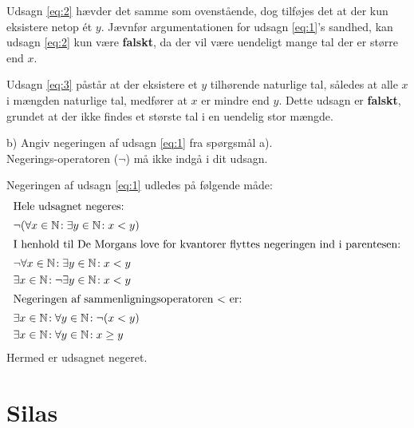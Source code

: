 \documentclass[12pt, a4paper]{article}
\begin{document}
Udsagn \eqref{eq:2} hævder det samme som ovenstående, dog tilføjes det at der kun eksistere netop ét \(y\). Jævnfør argumentationen for udsagn \eqref{eq:1}'s sandhed, kan udsagn \eqref{eq:2} kun være \textbf{falskt}, da der vil være uendeligt mange tal der er større end \(x\).

Udsagn \eqref{eq:3} påstår at der eksistere et \(y\) tilhørende naturlige tal, således at alle \(x\) i mængden naturlige tal, medfører at \(x\) er mindre end \(y\). Dette udsagn er \textbf{falskt}, grundet at der ikke findes et største tal i en uendelig stor mængde.
\begin{tcolorbox}
b) Angiv negeringen af udsagn \eqref{eq:1} fra spørgsmål a).\\ Negerings-operatoren (\(\neg\)) må ikke indgå i dit udsagn.
\end{tcolorbox}\vspace{-5pt}
Negeringen af udsagn \eqref{eq:1} udledes på følgende måde:\vspace{-5pt}
\begin{align}
\intertext{Hele udsagnet negeres:}
	&\neg(\forall x \in \mathbb{N}\! : \exists y \in \mathbb{N}\! : x < y)\\
\intertext{I henhold til De Morgans love for kvantorer flyttes negeringen ind i parentesen:}
	&\neg\forall x \in \mathbb{N}\! : \exists y \in \mathbb{N}\! : x < y\\
	&\exists x \in \mathbb{N}\! : \neg\exists y \in \mathbb{N}\! : x < y\\
\intertext{Negeringen af sammenligningsoperatoren $<$ er:}
	&\exists x \in \mathbb{N}\! : \forall y \in \mathbb{N}\! : \neg(x < y)\\
	&\exists x \in \mathbb{N}\! : \forall y \in \mathbb{N}\! : x \geq y
\end{align}
Hermed er udsagnet negeret.
\newpage

\section{Silas}
\end{document}
